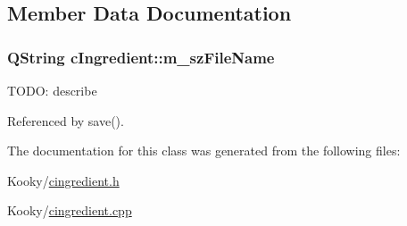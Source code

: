 \subsection{Member Data Documentation}
\subsubsection[{\texorpdfstring{m\+\_\+sz\+File\+Name}{m_szFileName}}]{\setlength{\rightskip}{0pt plus 5cm}Q\+String c\+Ingredient\+::m\+\_\+sz\+File\+Name\hspace{0.3cm}{\ttfamily [private]}}\hypertarget{classc_ingredient_af52301d7db3ff89d1af599408aaf06ea}{}\label{classc_ingredient_af52301d7db3ff89d1af599408aaf06ea}
T\+O\+DO\+: describe 

Referenced by save().



The documentation for this class was generated from the following files\+:\begin{DoxyCompactItemize}
\item 
Kooky/\hyperlink{cingredient_8h}{cingredient.\+h}\item 
Kooky/\hyperlink{cingredient_8cpp}{cingredient.\+cpp}\end{DoxyCompactItemize}
